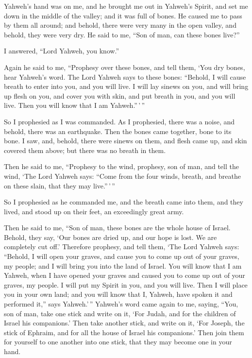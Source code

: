  Yahweh's hand was on me, and he brought me out in
Yahweh's Spirit, and set me down in the middle of the valley; and it was
full of bones.  He caused me to pass by them all around;
and behold, there were very many in the open valley, and behold, they
were very dry.  He said to me, ``Son of man, can these
bones live?''

I answered, ``Lord Yahweh, you know.''

 Again he said to me, ``Prophesy over these bones, and
tell them, `You dry bones, hear Yahweh's word.  The Lord
Yahweh says to these bones: ``Behold, I will cause breath to enter into
you, and you will live.  I will lay sinews on you, and
will bring up flesh on you, and cover you with skin, and put breath in
you, and you will live. Then you will know that I am Yahweh.''\,'\,''

 So I prophesied as I was commanded. As I prophesied,
there was a noise, and behold, there was an earthquake. Then the bones
came together, bone to its bone.  I saw, and, behold,
there were sinews on them, and flesh came up, and skin covered them
above; but there was no breath in them.

 Then he said to me, ``Prophesy to the wind, prophesy, son
of man, and tell the wind, `The Lord Yahweh says: ``Come from the four
winds, breath, and breathe on these slain, that they may live.''\,'\,''

 So I prophesied as he commanded me, and the breath came
into them, and they lived, and stood up on their feet, an exceedingly
great army.

 Then he said to me, ``Son of man, these bones are the
whole house of Israel. Behold, they say, `Our bones are dried up, and
our hope is lost. We are completely cut off.'  Therefore
prophesy, and tell them, `The Lord Yahweh says: ``Behold, I will open
your graves, and cause you to come up out of your graves, my people; and
I will bring you into the land of Israel.  You will know
that I am Yahweh, when I have opened your graves and caused you to come
up out of your graves, my people.  I will put my Spirit
in you, and you will live. Then I will place you in your own land; and
you will know that I, Yahweh, have spoken it and performed it,'' says
Yahweh.'\,''  Yahweh's word came again to me, saying,
 ``You, son of man, take one stick and write on it, `For
Judah, and for the children of Israel his companions.' Then take another
stick, and write on it, `For Joseph, the stick of Ephraim, and for all
the house of Israel his companions.'  Then join them for
yourself to one another into one stick, that they may become one in your
hand.


